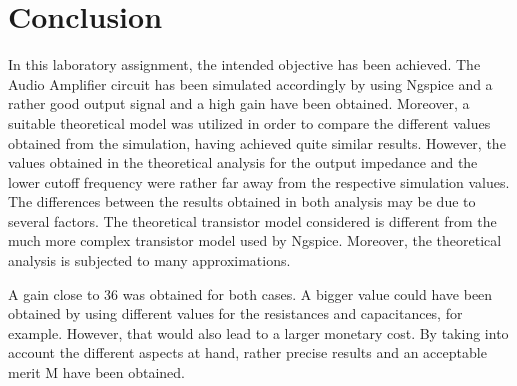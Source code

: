 \section{Conclusion} \label{sec:conclusion}

In this laboratory assignment, the intended objective has been achieved. The Audio Amplifier circuit has been simulated accordingly by using Ngspice and a rather good output signal and a high gain have been obtained. Moreover, a suitable theoretical model was utilized in order to compare the different values obtained from the simulation, having achieved quite similar results. However, the values obtained in the theoretical analysis for the output impedance and the lower cutoff frequency were rather far away from the respective simulation values. The differences between the results obtained in both analysis may be due to several factors. The theoretical transistor model considered is different from the much more complex transistor model used by Ngspice. Moreover, the theoretical analysis is subjected to many approximations.
\par
A gain close to 36 was obtained for both cases. A bigger value could have been obtained by using different values for the resistances and capacitances, for example. However, that would also lead to a larger monetary cost. By taking into account the different aspects at hand, rather precise results and an acceptable merit M have been obtained.
